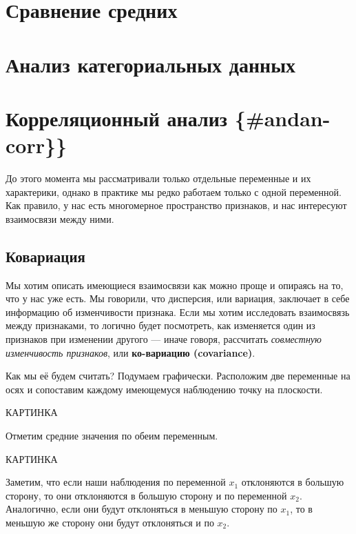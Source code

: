 \documentclass[
  letterpaper,
]{scrbook}
\theoremstyle{definition}
\theoremstyle{remark}
\begin{document}

\chapter{Сравнение средних}\label{andan-ttest}


\chapter{Анализ категориальных данных}\label{andan-chisq}


\chapter{Корреляционный анализ
\{\#andan-corr\}\}}\label{ux43aux43eux440ux440ux435ux43bux44fux446ux438ux43eux43dux43dux44bux439-ux430ux43dux430ux43bux438ux437-andan-corr}

До этого момента мы рассматривали только отдельные переменные и их
характерики, однако в практике мы редко работаем только с одной
переменной. Как правило, у нас есть многомерное пространство признаков,
и нас интересуют взаимосвязи между ними.

\section{Ковариация}\label{andan-corr-cov}

Мы хотим описать имеющиеся взаимосвязи как можно проще и опираясь на то,
что у нас уже есть. Мы говорили, что дисперсия, или вариация, заключает
в себе информацию об изменчивости признака. Если мы хотим исследовать
взаимосвязь между признаками, то логично будет посмотреть, как
изменяется один из признаков при изменении другого --- иначе говоря,
рассчитать \emph{совместную изменчивость признаков}, или
\textbf{ко-вариацию (covariance)}.

Как мы её будем считать? Подумаем графически. Расположим две переменные
на осях и сопоставим каждому имеющемуся наблюдению точку на плоскости.

КАРТИНКА

Отметим средние значения по обеим переменным.

КАРТИНКА

Заметим, что если наши наблюдения по переменной \(x_1\) отклоняются в
большую сторону, то они отклоняются в большую сторону и по переменной
\(x_2\). Аналогично, если они будут отклоняться в меньшую сторону по
\(x_1\), то в меньшую же сторону они будут отклоняться и по \(x_2\).
\end{document}
